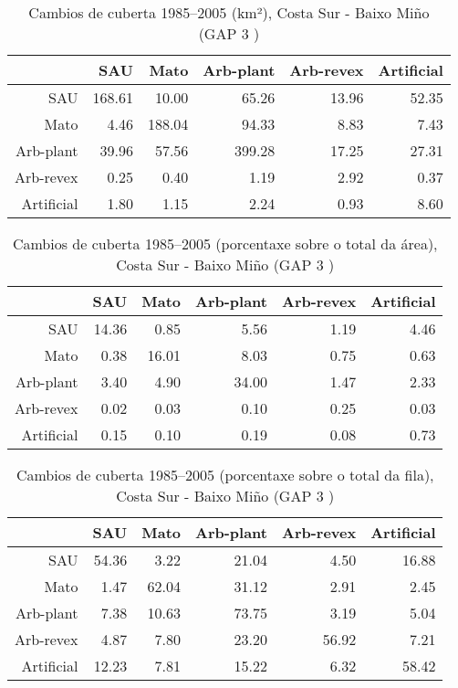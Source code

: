\clearpage
\begin{table}[p]
\centering
\caption{Cambios de cuberta 1985--2005 (km²), Costa Sur - Baixo Miño (GAP 3 )} 
\label{TaboaContinxGAP3}
\begin{tabular}{rrrrrr}
  \hline
 & SAU & Mato & Arb-plant & Arb-revex & Artificial \\ 
  \hline
SAU & 168.61 & 10.00 & 65.26 & 13.96 & 52.35 \\ 
  Mato & 4.46 & 188.04 & 94.33 & 8.83 & 7.43 \\ 
  Arb-plant & 39.96 & 57.56 & 399.28 & 17.25 & 27.31 \\ 
  Arb-revex & 0.25 & 0.40 & 1.19 & 2.92 & 0.37 \\ 
  Artificial & 1.80 & 1.15 & 2.24 & 0.93 & 8.60 \\ 
   \hline
\end{tabular}
\end{table}
\begin{table}[p]
\centering
\caption{Cambios de cuberta 1985--2005 (porcentaxe sobre o total da área), Costa Sur - Baixo Miño (GAP 3 )} 
\label{TaboaContinxPTGAP3}
\begin{tabular}{rrrrrr}
  \hline
 & SAU & Mato & Arb-plant & Arb-revex & Artificial \\ 
  \hline
SAU & 14.36 & 0.85 & 5.56 & 1.19 & 4.46 \\ 
  Mato & 0.38 & 16.01 & 8.03 & 0.75 & 0.63 \\ 
  Arb-plant & 3.40 & 4.90 & 34.00 & 1.47 & 2.33 \\ 
  Arb-revex & 0.02 & 0.03 & 0.10 & 0.25 & 0.03 \\ 
  Artificial & 0.15 & 0.10 & 0.19 & 0.08 & 0.73 \\ 
   \hline
\end{tabular}
\end{table}
\begin{table}[p]
\centering
\caption{Cambios de cuberta 1985--2005 (porcentaxe sobre o total da fila), Costa Sur - Baixo Miño (GAP 3 )} 
\label{TaboaContinxPFGAP3}
\begin{tabular}{rrrrrr}
  \hline
 & SAU & Mato & Arb-plant & Arb-revex & Artificial \\ 
  \hline
SAU & 54.36 & 3.22 & 21.04 & 4.50 & 16.88 \\ 
  Mato & 1.47 & 62.04 & 31.12 & 2.91 & 2.45 \\ 
  Arb-plant & 7.38 & 10.63 & 73.75 & 3.19 & 5.04 \\ 
  Arb-revex & 4.87 & 7.80 & 23.20 & 56.92 & 7.21 \\ 
  Artificial & 12.23 & 7.81 & 15.22 & 6.32 & 58.42 \\ 
   \hline
\end{tabular}
\end{table}
